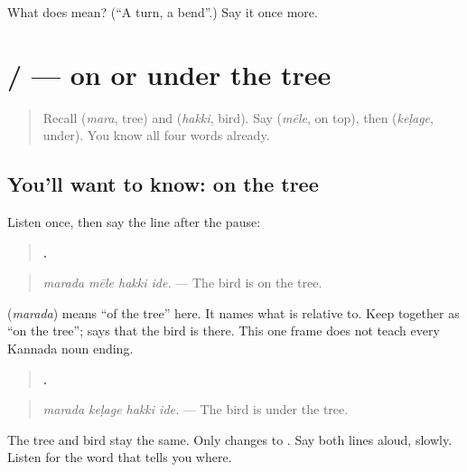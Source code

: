\begin{tcolorbox}[breakable,colback=teal!4,colframe=teal!35!black,title={Before you move on}]
What does  mean? (\textquotedblleft{}A turn, a bend\textquotedblright{}.) Say it once more.
\end{tcolorbox}
\section[\texorpdfstring{\kn{ಮರದ} \kn{ಮೇಲೆ} \kn{ಹಕ್ಕಿ} \kn{ಇದೆ}. (marada mēle hakki ide)}{ಮರದ ಮೇಲೆ ಹಕ್ಕಿ ಇದೆ. (marada mēle hakki ide)}]{  /   — on or under the tree}

\label{lesson:KA-C110-tree-on-under}



\begin{quote}
Recall \textbf{} (\emph{mara}, tree) and \textbf{} (\emph{hakki}, bird). Say \textbf{} (\emph{mēle}, on top), then \textbf{} (\emph{keḷage}, under). You know all four words already.
\end{quote}

\subsection*{You'll want to know: on the tree}
Listen once, then say the line after the pause:

\begin{quote}
\textbf{   .}
\end{quote}

\begin{quote}
\emph{marada mēle hakki ide.} — The bird is on the tree.
\end{quote}

\textbf{} (\emph{marada}) means “of the tree” here. It names what \textbf{} is relative to. Keep \textbf{ } together as “on the tree”; \textbf{ } says that the bird is there. This one frame does not teach every Kannada noun ending.

\begin{grammarlens}[title={Grammar lens: under the tree}]
\begin{quote}
\textbf{   .}
\end{quote}

\begin{quote}
\emph{marada keḷage hakki ide.} — The bird is under the tree.
\end{quote}

The tree and bird stay the same. Only \textbf{} changes to \textbf{}. Say both lines aloud, slowly. Listen for the word that tells you where.
\end{grammarlens}

